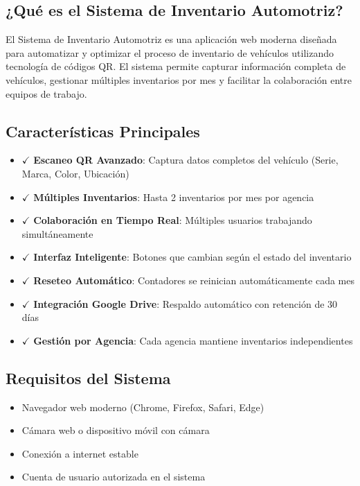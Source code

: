\documentclass[11pt,a4paper]{article}
\newcommand{\feature}[1]{\textcolor{gradient1}{$\checkmark$} #1}
\begin{document}
\subsection{¿Qué es el Sistema de Inventario Automotriz?}

El Sistema de Inventario Automotriz es una aplicación web moderna diseñada para automatizar y optimizar el proceso de inventario de vehículos utilizando tecnología de códigos QR. El sistema permite capturar información completa de vehículos, gestionar múltiples inventarios por mes y facilitar la colaboración entre equipos de trabajo.

\subsection{Características Principales}

\begin{infobox}
\begin{itemize}
    \item \feature{\textbf{Escaneo QR Avanzado}: Captura datos completos del vehículo (Serie, Marca, Color, Ubicación)}
    \item \feature{\textbf{Múltiples Inventarios}: Hasta 2 inventarios por mes por agencia}
    \item \feature{\textbf{Colaboración en Tiempo Real}: Múltiples usuarios trabajando simultáneamente}
    \item \feature{\textbf{Interfaz Inteligente}: Botones que cambian según el estado del inventario}
    \item \feature{\textbf{Reseteo Automático}: Contadores se reinician automáticamente cada mes}
    \item \feature{\textbf{Integración Google Drive}: Respaldo automático con retención de 30 días}
    \item \feature{\textbf{Gestión por Agencia}: Cada agencia mantiene inventarios independientes}
\end{itemize}
\end{infobox}

\subsection{Requisitos del Sistema}

\begin{itemize}
    \item Navegador web moderno (Chrome, Firefox, Safari, Edge)
    \item Cámara web o dispositivo móvil con cámara
    \item Conexión a internet estable
    \item Cuenta de usuario autorizada en el sistema
\end{itemize}
\end{document}
